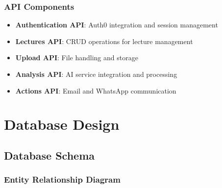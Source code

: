\documentclass[12pt,a4paper]{article}
\begin{document}
\subsubsection{API Components}
\begin{itemize}
    \item \textbf{Authentication API}: Auth0 integration and session management
    \item \textbf{Lectures API}: CRUD operations for lecture management
    \item \textbf{Upload API}: File handling and storage
    \item \textbf{Analysis API}: AI service integration and processing
    \item \textbf{Actions API}: Email and WhatsApp communication
\end{itemize}

\section{Database Design}

\subsection{Database Schema}

\subsubsection{Entity Relationship Diagram}
\end{document}

